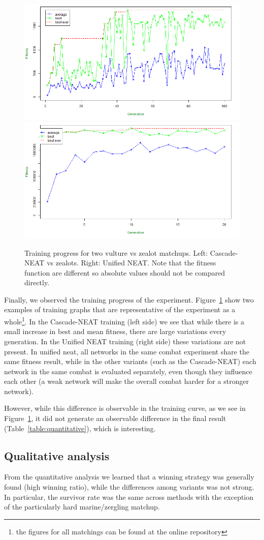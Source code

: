 \begin{figure}
  \includegraphics[width=.4\textwidth]{figures/evolution_zealot}
  \includegraphics[width=.4\textwidth]{figures/evolution_unified}
  \caption{Training progress for two vulture vs zealot matchups. Left:
    Cascade-NEAT vs zealots. Right: Unified NEAT. Note that the
    fitness function are different so absolute values should not be
    compared directly.}\label{fig:evolution}
\end{figure}

Finally, we observed the training progress of the
experiment. Figure~\ref{fig:evolution} show two examples of training
graphs that are representative of the experiment as a
whole\footnote{the figures for all matchings can be found at the
online repository}. In the Cascade-NEAT training (left side) we see
that while there is a small increase in best and mean fitness, there
are large variations every generation. In the Unified NEAT training
(right side) these variations are not present. In unified neat, all
networks in the same combat experiment share the same fitness result,
while in the other variants (such as the Cascade-NEAT) each network in
the same combat is evaluated separately, even though they influence
each other (a weak network will make the overall combat harder for a
stronger network).

However, while this difference is observable in the training curve, as
we see in Figure~\ref{fig:evolution}, it did not generate an
observable difference in the final result
(Table~\ref{table:quantitative}), which is interesting.

\subsection{Qualitative analysis}\label{subsec:qualitative}

From the quantitative analysis we learned that a winning strategy was
generally found (high winning ratio), while the differences among
variants was not strong. In particular, the survivor rate was the same
across methods with the exception of the particularly hard
marine/zergling matchup.

